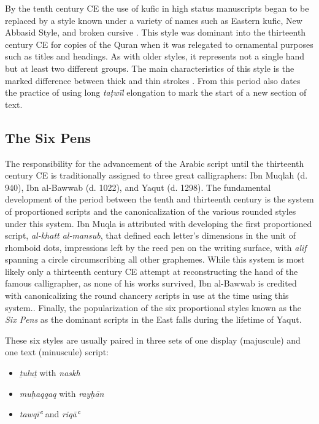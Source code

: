 By the tenth century CE the use of kufic in high status manuscripts began to be
replaced by a style known under a variety of names such as Eastern kufic, New
Abbasid Style, and broken cursive \cite[pg. 144]{blair2006islamic}. This style
was dominant into the thirteenth century CE for copies of the Quran when it was
relegated to ornamental purposes such as titles and headings. As with older
styles, it represents not a single hand but at least two different groups. The
main characteristics of this style is the marked difference between thick and
thin strokes \cite[pg. 167-168]{gacek2009arabic}. From this period also dates
the practice of using long \emph{taṭwīl} elongation to mark the start of a new
section of text\cite[pg. 165]{blair2006islamic}.

\subsection{The Six Pens}

The responsibility for the advancement of the Arabic script until the
thirteenth century CE is traditionally assigned to three great calligraphers:
Ibn Muqlah (d. 940), Ibn al-Bawwab (d. 1022), and Yaqut (d. 1298). The
fundamental development of the period between the tenth and thirteenth century
is the system of proportioned scripts and the canonicalization of the various
rounded styles under this system. Ibn Muqla is attributed with developing the
first proportioned script, \emph{al-khatt al-mansub}, that defined each
letter's dimensions in the unit of rhomboid dots, impressions left by the reed
pen on the writing surface, with \emph{alif} spanning a circle circumscribing
all other graphemes. While this system is most likely only a thirteenth century
CE attempt at reconstructing the hand of the famous calligrapher, as none of
his works survived, Ibn al-Bawwab is credited with canonicalizing the round
chancery scripts in use at the time using this system.\cite[pg. 158-160,
213]{blair2006islamic}. Finally, the popularization of the six proportional
styles known as the \emph{Six Pens} as the dominant scripts in the East falls
during the lifetime of Yaqut\cite[pg. 251]{gacek2009arabic}.

These six styles are usually paired in three sets of one display (majuscule)
and one text (minuscule) script:

\begin{itemize}
	\item \emph{ṯuluṯ} with \emph{naskh}
	\item \emph{muḥaqqaq} with \emph{rayḥān}
	\item \emph{tawqīʿ} and \emph{riqāʿ}
\end{itemize}


